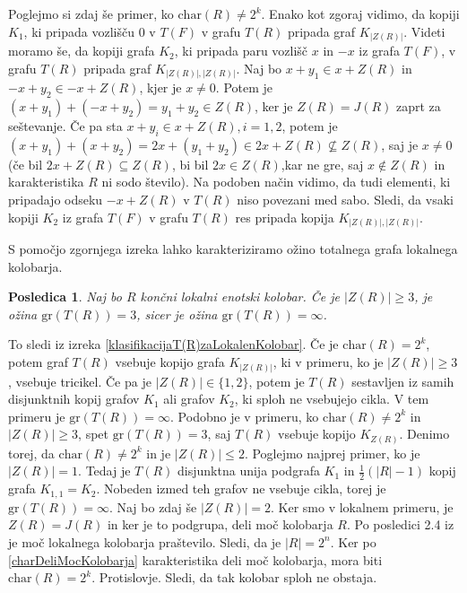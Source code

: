 \documentclass[a4paper, 12pt]{amsart}
\theoremstyle{definition} %
\theoremstyle{plain} %
\newtheorem{posledica}[definicija]{Posledica}
\begin{document}
Poglejmo si zdaj še primer, ko $\textrm{char}(R) \neq 2^k$. Enako kot zgoraj vidimo, da kopiji $K_1$, ki pripada vozlišču $0$ v $T(F)$ v grafu $T(R)$ pripada graf $K_{|Z(R)|}$. Videti moramo še, da kopiji grafa  $K_2$, ki pripada paru vozlišč $x$ in $-x$ iz grafa $T(F)$, v grafu $T(R)$ pripada graf $K_{|Z(R)|, |Z(R)|}$. Naj bo $x+ y_1\in x  + Z(R)$ in $-x + y_2\in -x + Z(R)$, kjer je $x\neq 0$. Potem je $(x+y_1) + (-x + y_2 ) = y_1 + y_2\in Z(R)$, ker je $Z(R) = J(R)$ zaprt za seštevanje. Če pa sta $x+y_i \in x + Z(R), i=1,2$, potem je $(x+y_1) + (x+y_2) = 2x + (y_1 + y_2) \in 2x + Z(R) \not\subseteq Z(R)$, saj je $x\neq 0$ (če bil $2x +Z(R) \subseteq Z(R)$, bi bil $2x\in Z(R)$,kar ne gre, saj $x\notin Z(R)$ in karakteristika $R$ ni sodo število). Na podoben način vidimo, da tudi elementi, ki pripadajo odseku $-x + Z(R)$ v $T(R)$ niso povezani med sabo. Sledi, da vsaki kopiji $K_2$ iz grafa $T(F)$ v grafu $T(R)$ res pripada kopija $K_{|Z(R)|,|Z(R)|}$.
\endproof

S pomočjo zgornjega izreka lahko karakteriziramo ožino totalnega grafa lokalnega kolobarja.

\begin{posledica}
Naj bo $R$ končni lokalni enotski kolobar. Če je $|Z(R)| \ge 3$, je ožina $\textrm{gr}(T(R)) = 3$, sicer je ožina $\textrm {gr}(T(R)) = \infty$.
\end{posledica}

\proof
To sledi iz izreka \ref{klasifikacijaT(R)zaLokalenKolobar}. Če je $\textrm{char}(R) = 2^k$, potem graf $T(R)$ vsebuje kopijo grafa $K_{|Z(R)|}$, ki v primeru, ko je $|Z(R)| \ge 3$, vsebuje tricikel. Če pa je $|Z(R)| \in \{1,2\}$, potem je $T(R)$ sestavljen iz samih disjunktnih kopij grafov $K_1$ ali grafov $K_2$, ki sploh ne vsebujejo cikla. V tem primeru je $\textrm{gr}(T(R)) = \infty$. Podobno je v primeru, ko $\textrm{char}(R) \neq 2^k$ in $|Z(R)| \ge 3$, spet $\textrm{gr}(T(R)) = 3$, saj $T(R)$ vsebuje kopijo $K_{Z(R)}$. Denimo torej, da $\textrm{char}(R) \neq 2^k$ in je $|Z(R)| \le 2$. Poglejmo najprej primer, ko je $|Z(R)| = 1$. Tedaj je $T(R)$ disjunktna unija podgrafa $K_1$ in $\frac{1}{2}(|R| - 1)$ kopij grafa $K_{1,1} = K_2$. Nobeden izmed teh grafov ne vsebuje cikla, torej je $\textrm{gr} (T(R)) = \infty$. Naj bo zdaj še $|Z(R)| = 2$. Ker smo v lokalnem primeru, je $Z(R) = J(R)$ in ker je to podgrupa, deli moč kolobarja $R$. Po posledici 2.4 iz \cite{diploma} je moč lokalnega kolobarja praštevilo. Sledi, da je $|R| = 2^n$. Ker po \ref{charDeliMocKolobarja} karakteristika deli moč kolobarja, mora biti $\textrm{char}(R) = 2^k$. Protislovje. Sledi, da tak kolobar sploh ne obstaja.
\endproof
\end{document}
